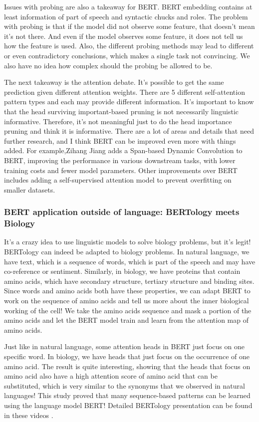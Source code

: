 \documentclass[]{article}
\begin{document}
Issues with probing are also a takeaway for BERT. BERT embedding contains at least information of part of speech and syntactic chucks and roles. The problem with probing is that if the model did not observe some feature, that doesn't mean it's not there. And even if the model observes some feature, it does not tell us how the feature is used. Also, the different probing methods may lead to different or even contradictory conclusions, which makes a single task not convincing. We also have no idea how complex should the probing be allowed to be.

The next takeaway is the attention debate. It's possible to get the same prediction given different attention weights. There are 5 different self-attention pattern types and each may provide different information. It's important to know that the head surviving important-based pruning is not necessarily linguistic informative. Therefore, it's not meaningful just to do the head importance pruning and think it is informative.
There are a lot of areas and details that need further research, and I think BERT can be improved even more with things added. For example,Zihang Jiang adds a Span-based Dynamic Convolution to BERT, improving the performance in various downstream tasks, with lower training costs and fewer model parameters. Other improvements over BERT includes adding a self-supervised attention model to prevent overfitting on smaller datasets.\cite{b16}

\subsubsection{BERT application outside of language: BERTology meets Biology}
It's a crazy idea to use linguistic models to solve biology problems, but it's legit! BERTology\cite{b12} can indeed be adapted to biology problems. In natural language, we have text, which is a sequence of words, which is part of the speech and may have co-reference or sentiment. Similarly, in biology, we have proteins that contain amino acids, which have secondary structure, tertiary structure and binding sites. Since words and amino acids both have these properties, we can adapt BERT to work on the sequence of amino acids and tell us more about the inner biological working of the cell! We take the amino acids sequence and mask a portion of the amino acids and let the BERT model train and learn from the attention map of amino acids. 

Just like in natural language, some attention heads in BERT just focus on one specific word. In biology, we have heads that just focus on the occurrence of one amino acid. The result is quite interesting, showing that the heads that focus on amino acid also have a high attention score of amino acid that can be substituted, which is very similar to the synonyms that we observed in natural languages! This study proved that many sequence-based patterns can be learned using the language model BERT! 
Detailed BERTology presentation can be found in these videos \cite{b6, b7}.
\end{document}
